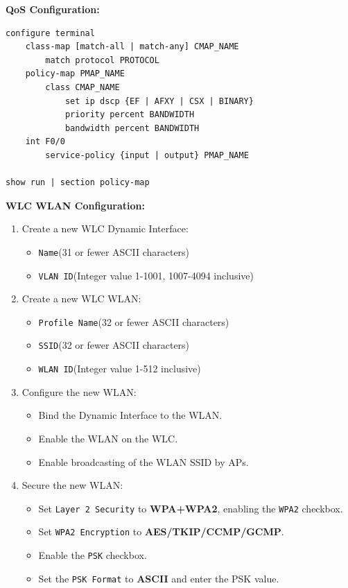 \documentclass[12pt]{article}
\begin{document}
	\noindent\textbf{QoS Configuration:}
	\begin{lstlisting}
configure terminal
	class-map [match-all | match-any] CMAP_NAME
		match protocol PROTOCOL
	policy-map PMAP_NAME
		class CMAP_NAME
			set ip dscp {EF | AFXY | CSX | BINARY}
			priority percent BANDWIDTH
			bandwidth percent BANDWIDTH
	int F0/0
		service-policy {input | output} PMAP_NAME
		
show run | section policy-map
	\end{lstlisting}
	\vspace{8px}
	
	\noindent\textbf{WLC WLAN Configuration:}
	\begin{enumerate}
		\item{Create a new WLC Dynamic Interface:}
		\begin{itemize}
			\item{\texttt{Name}\hfill(31 or fewer ASCII characters)}
			\item{\texttt{VLAN ID}\hfill(Integer value 1-1001, 1007-4094 inclusive)}
		\end{itemize}
		\item{Create a new WLC WLAN:}
		\begin{itemize}
			\item{\texttt{Profile Name}\hfill(32 or fewer ASCII characters)}
			\item{\texttt{SSID}\hfill(32 or fewer ASCII characters)}
			\item{\texttt{WLAN ID}\hfill(Integer value 1-512 inclusive)}
		\end{itemize}
		\item{Configure the new WLAN:}
		\begin{itemize}
			\item{Bind the Dynamic Interface to the WLAN.}
			\item{Enable the WLAN on the WLC.}
			\item{Enable broadcasting of the WLAN SSID by APs.}
		\end{itemize}
		\item{Secure the new WLAN:}
		\begin{itemize}
			\item{Set \texttt{Layer 2 Security} to \textbf{WPA+WPA2}, enabling the \texttt{WPA2} checkbox.}
			\item{Set \texttt{WPA2 Encryption} to \textbf{AES/TKIP/CCMP/GCMP}.}
			\item{Enable the \texttt{PSK} checkbox.}
			\item{Set the \texttt{PSK Format} to \textbf{ASCII} and enter the PSK value.}
		\end{itemize}
	\end{enumerate}

\end{document}
